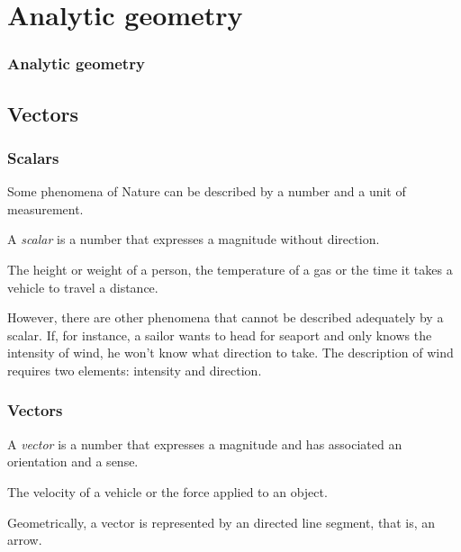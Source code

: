 \section{Analytic geometry}

\begin{frame}
\frametitle{Analytic geometry}
\setlength{\parskip}{0.3em}
\tableofcontents[sectionstyle=show/hide,hideothersubsections]
\end{frame}

\subsection{Vectors}

\begin{frame}
\frametitle{Scalars}
Some phenomena of Nature can be described by a number and a unit of measurement. 

\begin{definition}[Scalar]
A \emph{scalar} is a number that expresses a magnitude without direction.
\end{definition}
 The height or weight of a person, the temperature of a gas or the time it takes a vehicle to travel a distance.

However, there are other phenomena that cannot be described adequately by a scalar. 
If, for instance, a sailor wants to head for seaport and only knows the intensity of wind, he won't know what direction to take. The description of wind requires two elements: intensity and direction. 
\end{frame}


\begin{frame}
\frametitle{Vectors}
\begin{definition}[Vector]
A \emph{vector} is a number that expresses a magnitude and has associated an orientation and a sense.
\end{definition}

 The velocity of a vehicle or the force applied to an object. 

Geometrically, a vector is represented by an directed line segment, that is, an arrow. 
\begin{center}

\end{center}
\end{frame}


